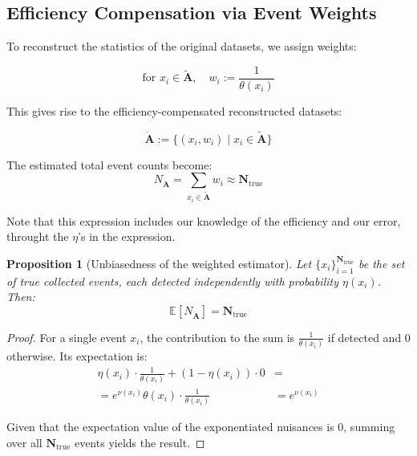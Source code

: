 \documentclass{article}
\newtheorem{proposition}[theorem]{Proposition}
\newcommand{\dataset}[1]{{\mathbf{#1}}}         %
\newcommand{\true}[1]{{\dataset{#1}}_{\text{true}}}  %
\newcommand{\meas}[1]{{\dataset{\tilde{#1}}}}   %
\newcommand{\reco}[1]{{\dataset{\dot{#1}}}}     %
\begin{document}
\subsection{Efficiency Compensation via Event Weights}

To reconstruct the statistics of the original datasets, we assign weights:

\begin{equation}
\label{eq:def_weights}
\text{for } x_i \in \tilde{\mathbf{A}}, \quad w_i := \frac{1}{\theta(x_i)}
\end{equation}

This gives rise to the efficiency-compensated reconstructed datasets:

\[
\dot{\mathbf{A}} := \{ (x_i, w_i) \mid x_i \in \tilde{\mathbf{A}} \}
\]

The estimated total event counts become:
\[
N_\reco{A} = \sum_{x_i \in \meas{A}} w_i \approx \true{N}
\]

Note that this expression includes our knowledge of the efficiency and our error, throught the $\eta$'s in the expression.

\begin{proposition}[Unbiasedness of the weighted estimator]\label{prop:unbiasedness_of_weights}
    Let \(\{x_i\}_{i=1}^{\true{N}}\) be the set of true collected events, each detected independently with probability \(\eta(x_i)\). Then:
\[
\mathbb{E}\!\left[ N_\reco{A} \right] = \true{N}
\]
\end{proposition}

\begin{proof}
    For a single event \(x_i\), the contribution to the sum is \(\frac{1}{\theta(x_i)}\) if detected and \(0\) otherwise. Its expectation is:
\begin{align*}
\eta(x_i) \cdot \frac{1}{\theta(x_i)} + (1-\eta(x_i))\cdot 0 &= \\
= e^{\nu(x_i)}\theta(x_i) \cdot \frac{1}{\theta(x_i)} &= e^{\nu(x_i)}
\end{align*}


Given that the expectation value of the exponentiated nuisances is 0, summing over all \(\true{N}\) events yields the result. 
\end{proof}
\end{document}

